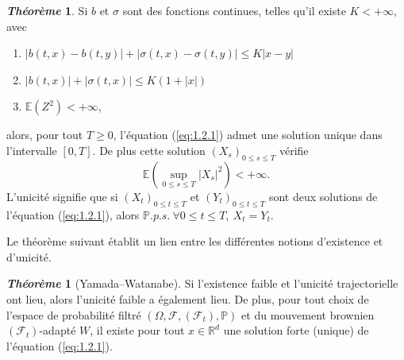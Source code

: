 \documentclass[12pt,a4paper,twoside]{book}%
\theoremstyle{definition}
\newtheorem{thm}[dfn]{\textit{Théorème}}
\numberwithin{equation}{section}
\begin{document}
\begin{thm}
	Si \( b \) et \( \sigma \) sont des fonctions continues, telles qu'il existe \( K < +\infty \), avec
	\begin{enumerate}
		\item \( |b(t,x) - b(t,y)| + |\sigma(t,x) - \sigma(t,y)| \leq K|x - y| \)
		\item \( |b(t,x)| + |\sigma(t,x)| \leq K(1 + |x|) \)
		\item \( \mathbb{E}(Z^2) < +\infty \),
	\end{enumerate}
	alors, pour tout \( T \geq 0 \), l'équation (\ref{eq:1.2.1}) admet une solution unique dans l'intervalle \([0,T]\). De plus cette solution \((X_s)_{0 \leq s \leq T}\) vérifie
	\[
	\mathbb{E} \left( \sup_{0 \leq s \leq T} |X_s|^2 \right) < +\infty.
	\]
	L'unicité signifie que si \((X_t)_{0 \leq t \leq T}\) et \((Y_t)_{0 \leq t \leq T}\) sont deux solutions de l'équation (\ref{eq:1.2.1}), alors \( \mathbb{P}.p.s. \ \forall 0 \leq t \leq T, \ X_t = Y_t. \)
\end{thm}

Le théorème suivant établit un lien entre les différentes notions d'existence et d'unicité.

\begin{thm}[Yamada–Watanabe]
	Si l’existence faible et l’unicité trajectorielle ont lieu, alors l’unicité faible a également lieu. De plus, pour tout choix de l’espace de probabilité filtré \((\Omega, \mathcal{F}, (\mathcal{F}_t), \mathbb{P})\) et du mouvement brownien \((\mathcal{F}_t)\)-adapté $W$, il existe pour tout \(x \in \mathbb{R}^d\) une solution forte (unique) de l’équation (\ref{eq:1.2.1}).
\end{thm}
\end{document}
